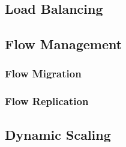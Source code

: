 \subsection{Load Balancing}

\subsection{Flow Management}
\subsubsection{Flow Migration}
\subsubsection{Flow Replication}

\subsection{Dynamic Scaling}
